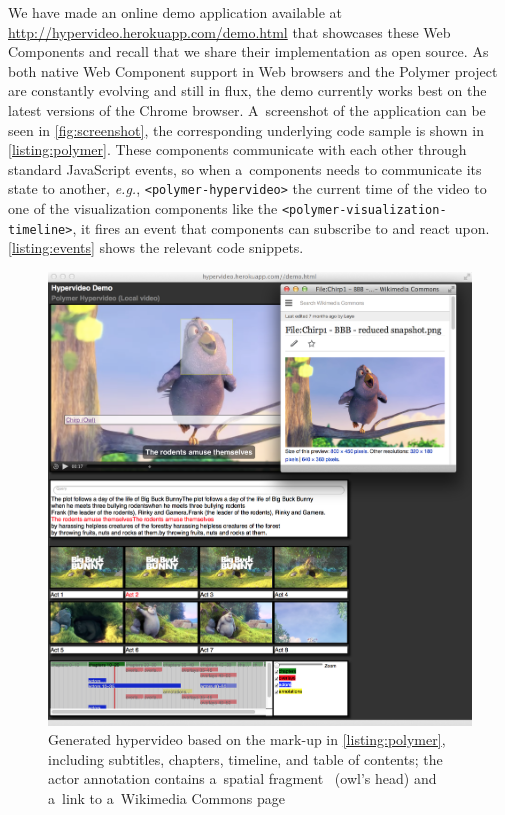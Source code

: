 \documentclass[runningheads,a4paper]{llncs}
\begin{document}
\noindent We have made an online demo application available at
\url{http://hypervideo.herokuapp.com/demo.html} that showcases these Web Components
and recall that we share their implementation as open source.
As both native Web Component support in Web browsers and the Polymer project
are constantly evolving and still in flux, the demo currently works best on
the latest versions of the Chrome browser.
A~screenshot of the application can be seen in \autoref{fig:screenshot},
the corresponding underlying code sample is shown in \autoref{listing:polymer}.
These components communicate with each other through standard JavaScript events,
so when a~components needs to communicate its state to another, \emph{e.g.},
\texttt{<polymer-hypervideo>} the current time of the video to one of the
visualization components like the \texttt{<polymer-visualization-timeline>},
it fires an event that components can subscribe to and react upon.
\autoref{listing:events} shows the relevant code snippets.

\begin{figure}[htb!]
  \centering
  \includegraphics[width=0.95\linewidth]{screenshot}
  \caption{Generated hypervideo based on the mark-up in \autoref{listing:polymer},
  including subtitles, chapters, timeline, and table of contents;
  the actor annotation contains a~spatial fragment~\cite{troncy2012mediafragments}
  (owl's head) and a~link
  to a~Wikimedia Commons page}
  \label{fig:screenshot}
\end{figure}
\end{document}
